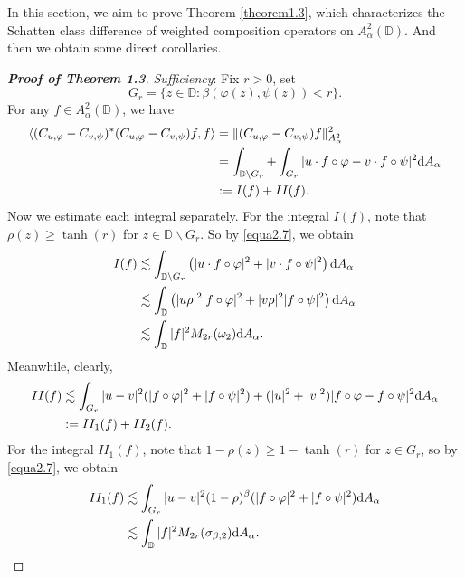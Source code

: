 \documentclass[preprint,12pt,times]{elsarticle}
\theoremstyle{definition}
\theoremstyle{remark}
\numberwithin{equation}{section}
\begin{document}
In this section, we aim to prove Theorem \ref{theorem1.3}, which characterizes the Schatten class difference of weighted composition operators on $A_{\alpha}^2(\mathbb{D})$. And then we obtain some direct corollaries.

\begin{proof}[{\bf Proof of Theorem 1.3}]
{\it Sufficiency}: Fix $r>0$, set 
$$G_r=\{z\in\mathbb{D}:\beta(\varphi(z),\psi(z))<r\}.$$
For any $f\in A_{\alpha}^2(\mathbb{D})$, we have
\begin{equation*}
\begin{split}
\langle (C_{u,\varphi}-C_{v,\psi})^*(C_{u,\varphi}-C_{v,\psi})f,f\rangle&=\|(C_{u,\varphi}-C_{v,\psi})f\|_{A_{\alpha}^2}^2\\
&=\int_{\mathbb{D}\backslash G_r}+\int_{G_r}|u\cdot f\circ\varphi-v\cdot f\circ\psi|^2{\rm d}A_{\alpha}\\
&:=I(f)+II(f).
\end{split}
\end{equation*}
Now we estimate each integral separately. For the integral $I(f)$, note that $\rho(z)\geq \tanh(r)$ for $z\in \mathbb{D}\backslash G_r$. So by \eqref{equa2.7}, we obtain
\begin{equation}\label{equa4.1}
\begin{split}
I(f)&\lesssim \int_{\mathbb{D}\backslash G_r}\left(|u\cdot f\circ\varphi|^2+|v\cdot f\circ\psi|^2\right){\rm d}A_{\alpha}\\
&\lesssim \int_{\mathbb{D}}\left(|u\rho|^2|f\circ\varphi|^2+|v\rho|^2|f\circ\psi|^2\right){\rm d}A_{\alpha}\\
&\lesssim \int_{\mathbb{D}}|f|^2M_{2r}(\omega_2){\rm d}A_{\alpha}.
\end{split}
\end{equation}
Meanwhile, clearly,
\begin{align*}
II(f)&\lesssim \int_{G_r}|u-v|^2(|f\circ\varphi|^2+|f\circ\psi|^2)+(|u|^2+|v|^2)|f\circ\varphi-f\circ\psi|^2{\rm d}A_{\alpha}\\
&:=II_1(f)+II_2(f).
\end{align*}
For the integral $II_1(f)$, note that $1-\rho(z)\geq 1-\tanh(r)$ for $z\in G_r$, so by \eqref{equa2.7}, we obtain
\begin{equation}\label{equa4.2}
\begin{split}
II_1(f)&\lesssim \int_{G_r}|u-v|^2(1-\rho)^{\beta}(|f\circ\varphi|^2+|f\circ\psi|^2){\rm d}A_{\alpha}\\
&\lesssim \int_{\mathbb{D}}|f|^2M_{2r}(\sigma_{\beta,2}){\rm d}A_{\alpha}.
\end{split}

\end{equation}
\end{proof}
\end{document}
